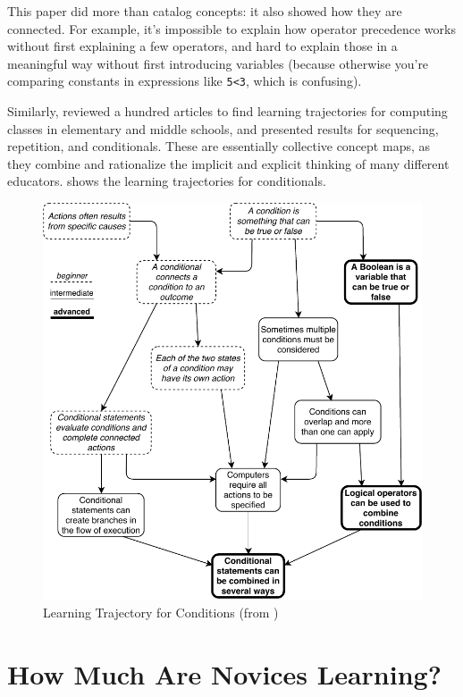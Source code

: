 This paper did more than catalog concepts: it also showed how they are
connected.  For example, it's impossible to explain how operator
precedence works without first explaining a few operators, and hard to
explain those in a meaningful way without first introducing variables
(because otherwise you're comparing constants in expressions like
\texttt{5{\textless}3}, which is confusing).

Similarly, \cite{Rich2017} reviewed a hundred articles to find
learning trajectories for computing classes in elementary and middle
schools, and presented results for sequencing, repetition, and
conditionals.  These are essentially collective concept maps, as they
combine and rationalize the implicit and explicit thinking of many
different educators.   shows the learning
trajectories for conditionals.

\begin{figure}
\centering
\includegraphics{../docs/fig/conditionals.pdf}
\caption{Learning Trajectory for Conditions (from \cite{Rich2017})}
\label{f:pck-trajectory}
\end{figure}

\section{How Much Are Novices Learning?}\label{s:pck-baseline}

